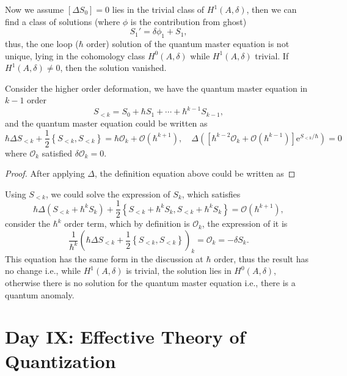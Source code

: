\documentclass[10pt]{article}
\begin{document}
Now we assume $[\Delta S_0] = 0$ lies in the trivial class of $ H^{1}(A, \delta)$, then we can find a class of solutions (where $ \phi$ is the contribution from ghost)
\begin{equation*}
  S_1' = \delta \phi_1 + S_1,
\end{equation*}
thus, the one loop ($ \hbar$ order) solution of the quantum master equation is not unique, lying in the cohomology class $ H^{0}(A,\delta)$ while $ H^{1}(A, \delta)$ trivial. If $ H^{1}(A, \delta) \neq 0$, then the solution vanished.

Consider the higher order deformation, we have the quantum master equation in $ k - 1$ order
\begin{equation*}
  S_{<k} = S_0 + \hbar S_1 + \cdots + \hbar^{k-1} S_{k-1},
\end{equation*}
and the quantum master equation could be written as
\begin{equation*}
  \hbar \Delta S_{<k} + \frac{1}{2} \left\{ S_{<k}, S_{<k} \right\} = \hbar \mathcal{O}_{k} + \mathcal{O}(\hbar^{k+1}), \quad \Delta \left( \left[ \hbar^{k-2} \mathcal{O}_{k} + \mathcal{O}(\hbar^{k-1}) \right] \mathrm{e}^{S_{<k} / \hbar} \right) = 0
\end{equation*}
where $ \mathcal{O}_{k}$ satisfied $ \delta \mathcal{O}_{k} = 0$.
\begin{proof}
  After applying $ \Delta$, the definition equation above could be written as
\end{proof}
Using $ S_{<k}$, we could solve the expression of $ S_k$, which satisfies
\begin{equation*}
  \hbar \Delta (S_{<k} + \hbar^{k} S_{k}) + \frac{1}{2} \left\{  S_{<k} + \hbar^{k} S_k, S_{<k} + \hbar^{k} S_k\right\} = \mathcal{O}(\hbar^{k+1}),
\end{equation*}
consider the $ \hbar^{k}$ order term, which by definition is $ \mathcal{O}_{k}$, the expression of it is
\begin{equation*}
  \frac{1}{\hbar^{k}}\left( \hbar \Delta S_{<k} + \frac{1}{2} \left\{ S_{<k}, S_{<k} \right\} \right)_{k} = \mathcal{O}_{k} = - \delta S_{k}.
\end{equation*}
This equation has the same form in the discussion at $ \hbar$ order, thus the result has no change i.e., while $ H^{1}(A, \delta)$ is trivial, the solution lies in $ H^{0}(A, \delta)$, otherwise there is no solution for the quantum master equation i.e., there is a quantum anomaly.

\section{Day IX: Effective Theory of Quantization}
\end{document}
